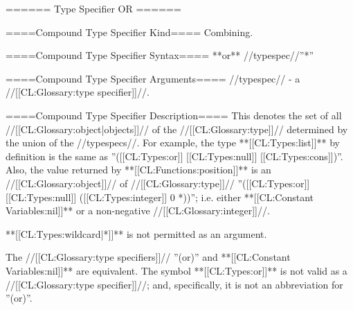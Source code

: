 ====== Type Specifier OR ======

====Compound Type Specifier Kind====
Combining.

====Compound Type Specifier Syntax====
**or** //typespec//''*''

====Compound Type Specifier Arguments====
//typespec// - a //[[CL:Glossary:type specifier]]//.

====Compound Type Specifier Description====
This denotes the set of all //[[CL:Glossary:object|objects]]// of the //[[CL:Glossary:type]]// determined by the union of the //typespecs//. For example, the type **[[CL:Types:list]]** by definition is the same as ''([[CL:Types:or]] [[CL:Types:null]] [[CL:Types:cons]])''. Also, the value returned by **[[CL:Functions:position]]** is an //[[CL:Glossary:object]]// of //[[CL:Glossary:type]]// ''([[CL:Types:or]] [[CL:Types:null]] ([[CL:Types:integer]] 0 *))''; i.e. either **[[CL:Constant Variables:nil]]** or a non-negative //[[CL:Glossary:integer]]//.

**[[CL:Types:wildcard|*]]** is not permitted as an argument.

The //[[CL:Glossary:type specifiers]]// ''(or)'' and **[[CL:Constant Variables:nil]]** are equivalent. The symbol **[[CL:Types:or]]** is not valid as a //[[CL:Glossary:type specifier]]//; and, specifically, it is not an abbreviation for ''(or)''.

